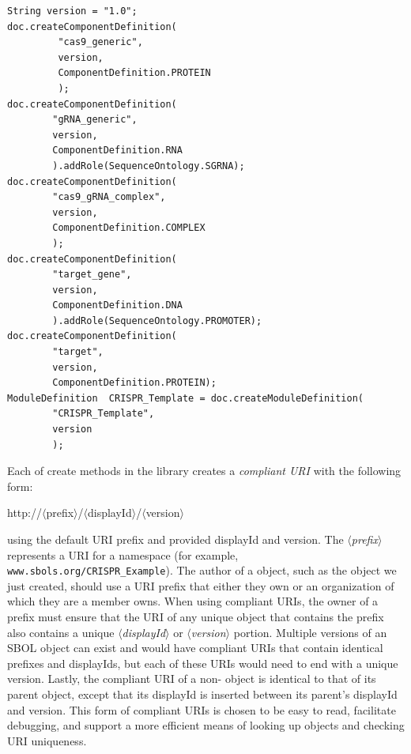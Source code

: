 \vspace{\abovedisplayskip}
\begin{minipage}{0.95\textwidth} 
\begin{lstlisting}
String version = "1.0";
doc.createComponentDefinition(
         "cas9_generic", 
         version, 
         ComponentDefinition.PROTEIN
         );
doc.createComponentDefinition(
        "gRNA_generic",
        version, 
        ComponentDefinition.RNA
        ).addRole(SequenceOntology.SGRNA);
doc.createComponentDefinition(
        "cas9_gRNA_complex",
        version, 
        ComponentDefinition.COMPLEX
        );
doc.createComponentDefinition(
        "target_gene",
        version, 
        ComponentDefinition.DNA
        ).addRole(SequenceOntology.PROMOTER);
doc.createComponentDefinition(
        "target",
        version, 
        ComponentDefinition.PROTEIN);
ModuleDefinition  CRISPR_Template = doc.createModuleDefinition(
        "CRISPR_Template", 
        version
        );
\end{lstlisting}
\end{minipage}

Each of create methods in the library creates a \emph{compliant URI} with the following form:
\begin{center}
http://$\langle$prefix$\rangle$/$\langle$displayId$\rangle$/$\langle$version$\rangle$
\end{center}
using the default URI prefix and provided displayId and version. The \emph{$\langle$prefix$\rangle$} represents a URI for a namespace (for example, {\tt www.sbols.org/CRISPR\_Example}). The author of a  object, such as the  object we just created, should use a URI prefix that either they own or an organization of which they are a member owns. When using compliant URIs, the owner of a prefix must ensure that the URI of any unique  object that contains the prefix also contains a unique  \emph{$\langle$displayId$\rangle$} or \emph{$\langle$version$\rangle$} portion. Multiple versions of an SBOL object can exist and would have compliant URIs that contain identical prefixes and displayIds, but each of these URIs would need to end with a unique version. Lastly, the compliant URI of a non- object is identical to that of its parent object, except that its displayId is inserted between its parent's displayId and version. This form of compliant URIs is chosen to be easy to read, facilitate debugging, and support a more efficient means of looking up objects and checking URI uniqueness. 

